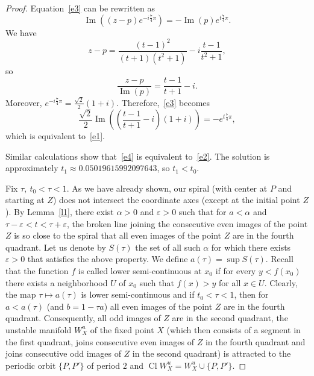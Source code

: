 \documentclass[10pt,a4paper]{amsart}
\def\Cl{\mathop\mathrm{Cl}}
\def\eps{\varepsilon}
\newcommand{\im}{\operatorname{Im}}
\begin{document}
\begin{proof}
		Equation~\eqref{e3} can be rewritten as
		\[
		\im\left((z - p)e^{-i \frac74 \pi}\right) = -\im(p)e^{t \frac74 \pi}.
		\]
		We have
		\[
		z - p = \frac{(t - 1)^2}{(t + 1)(t^2 + 1)} - i\frac{t - 1}{t^2 + 1},
		\]
		so
		\[
		\frac{z - p}{\im(p)} = \frac{t - 1}{t + 1} - i.
		\]
		Moreover, $e^{-i \frac74 \pi} = \frac{\sqrt{2}}2(1 + i)$.
		Therefore,~\eqref{e3} becomes
		\[
		\frac{\sqrt{2}}2\im\left(\left(\frac{t-1}{t+1}-i\right)(1+i)\right)
		= -e^{t \frac74 \pi},
		\]
		which is equivalent to~\eqref{e1}.
		
		Similar calculations show that~\eqref{e4} is equivalent to~\eqref{e2}.
		The solution is approximately $t_1\approx 0.05019615992097643$, so
		$t_1<t_0$.
		
		Fix $\tau, \ t_0 < \tau < 1$. As we have already shown, our spiral (with 
		center at $P$ and starting at $Z$) does not intersect the coordinate 
		axes (except at the initial point $Z$). By Lemma~\ref{l1}, there exist 
		$\alpha > 0$ and $\eps > 0$ such that for $a < \alpha$ and 
		$\tau - \eps < t < \tau + \eps$, the broken line joining the consecutive 
		even images of the point $Z$ is so close to the spiral that all even 
		images of the point $Z$ are in the fourth quadrant. Let us denote by 
		$S(\tau)$ the set of all such $\alpha$ for which there exists $\eps > 0$ 
		that satisfies the above property. We define $a(\tau) = \sup S(\tau)$. 
		Recall that the function $f$ is called lower semi-continuous at $x_0$ if 
		for every $y < f(x_0)$ there exists a neighborhood $U$ of $x_0$ such that 
		$f(x) > y$ for all $x \in U$. Clearly, the map $\tau \mapsto a(\tau)$ is 
		lower semi-continuous and if $t_0 < \tau < 1$, then for $a < a(\tau)$ (and 
		$b = 1 - \tau a$) all even images of the point $Z$ are in the fourth 
		quadrant. Consequently, all odd images of $Z$ are in the second quadrant, 
		the unstable manifold $W^u_X$ of the fixed point $X$ (which then consists 
		of a segment in the first quadrant, joins consecutive even images of $Z$ 
		in the fourth quadrant and joins consecutive odd images of $Z$ in the 
		second quadrant) is attracted to the periodic orbit $\{P,P'\}$ of period 
		$2$ and $\Cl W^u_X = W^u_X \cup \{ P, P' \}$.
	\end{proof}
\end{document}
